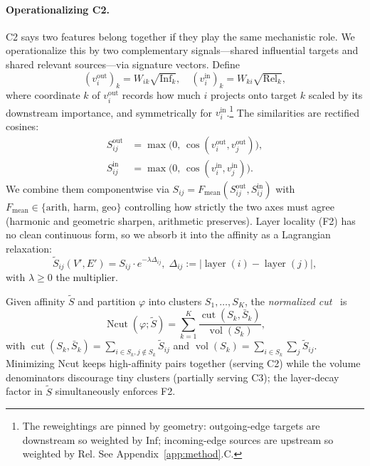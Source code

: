 \documentclass[table, 11pt]{article}
\DeclareMathOperator{\Ncut}{Ncut}
\DeclareMathOperator{\vol}{vol}
\DeclareMathOperator{\cut}{cut}
\DeclareMathOperator{\layer}{layer}
\begin{document}
\paragraph{Operationalizing C2.}
C2 says two features belong together if they play the same
mechanistic role. We operationalize this by two complementary
signals---shared influential targets and shared relevant
sources---via signature vectors. Define
\begin{equation}
(v_i^{\text{out}})_k = W_{ik} \sqrt{\text{Inf}_k}, \quad
(v_i^{\text{in}})_k  = W_{ki} \sqrt{\text{Rel}_k},
\label{eq:signatures}
\end{equation}
where coordinate $k$ of $v_i^{\text{out}}$ records how much $i$
projects onto target $k$ scaled by its downstream importance, and
symmetrically for $v_i^{\text{in}}$.\footnote{The reweightings are
pinned by geometry: outgoing-edge targets are downstream so weighted
by $\text{Inf}$; incoming-edge sources are upstream so weighted by
$\text{Rel}$. See Appendix~\ref{app:method}.C.} The similarities are
rectified cosines:
\begin{equation}
\begin{aligned}
S^{\text{out}}_{ij} &= \max\!\bigl(0,\, \cos(v_i^{\text{out}}, v_j^{\text{out}})\bigr), \\
S^{\text{in}}_{ij}  &= \max\!\bigl(0,\, \cos(v_i^{\text{in}},  v_j^{\text{in}})\bigr).
\end{aligned}
\label{eq:Sout-Sin}
\end{equation}
We combine them componentwise via
$S_{ij} = F_{\text{mean}}(S^{\text{out}}_{ij}, S^{\text{in}}_{ij})$
with $F_{\text{mean}} \in \{\text{arith, harm, geo}\}$ controlling
how strictly the two axes must agree (harmonic and geometric
sharpen, arithmetic preserves). Layer locality (F2) has no clean
continuous form, so we absorb it into the affinity as a Lagrangian
relaxation:
\begin{equation}
\tilde S_{ij}(V', E') = S_{ij} \cdot e^{-\lambda \Delta_{ij}}, \;
\Delta_{ij} := |\layer(i) - \layer(j)|,
\label{eq:Stilde}
\end{equation}
with $\lambda \ge 0$ the multiplier.

Given affinity $\tilde S$ and partition $\varphi$ into clusters
$S_1, \ldots, S_K$, the \emph{normalized cut}~\cite{shi2000normalized}
is
\begin{equation}
\Ncut(\varphi; \tilde S) = \sum_{k=1}^{K}
\frac{\cut(S_k, \bar S_k)}{\vol(S_k)},
\label{eq:ncut}
\end{equation}
with $\cut(S_k, \bar S_k) = \sum_{i \in S_k, j \notin S_k} \tilde S_{ij}$
and $\vol(S_k) = \sum_{i \in S_k} \sum_j \tilde S_{ij}$. Minimizing
Ncut keeps high-affinity pairs together (serving C2) while the
volume denominators discourage tiny clusters (partially serving C3);
the layer-decay factor in $\tilde S$ simultaneously enforces F2.
\end{document}

